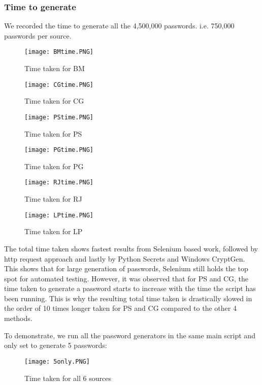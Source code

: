 \documentclass[letterpaper,twocolumn,10pt]{article}
\begin{document}
\subsubsection{Time to generate}
We recorded the time to generate all the 4,500,000 passwords. i.e. 750,000 passwords per source.

\begin{figure}[H]
    \centering
    \texttt{[image: BMtime.PNG]}
    \caption{Time taken for BM}
\end{figure}

\begin{figure}[H]
    \centering
    \texttt{[image: CGtime.PNG]}
    \caption{Time taken for CG}
\end{figure}

\begin{figure}[H]
    \centering
    \texttt{[image: PStime.PNG]}
    \caption{Time taken for PS}
\end{figure}

\begin{figure}[H]
    \centering
    \texttt{[image: PGtime.PNG]}
    \caption{Time taken for PG}
\end{figure}

\begin{figure}[H]
    \centering
    \texttt{[image: RJtime.PNG]}
    \caption{Time taken for RJ}
\end{figure}

\begin{figure}[H]
    \centering
    \texttt{[image: LPtime.PNG]}
    \caption{Time taken for LP}
\end{figure}

The total time taken shows fastest results from Selenium based work, followed by http request approach and lastly by Python Secrets and Windows CryptGen. This shows that for large generation of passwords, Selenium still holds the top spot for automated testing. However, it was observed that for PS and CG, the time taken to generate a password starts to increase with the time the script has been running. This is why the resulting total time taken is drastically slowed in the order of 10 times longer taken for PS and CG compared to the other 4 methods.

To demonstrate, we run all the password generators in the same main script and only set to generate 5 passwords:

\begin{figure}[H]
    \centering
    \texttt{[image: 5only.PNG]}
    \caption{Time taken for all 6 sources}
\end{figure}
\end{document}
